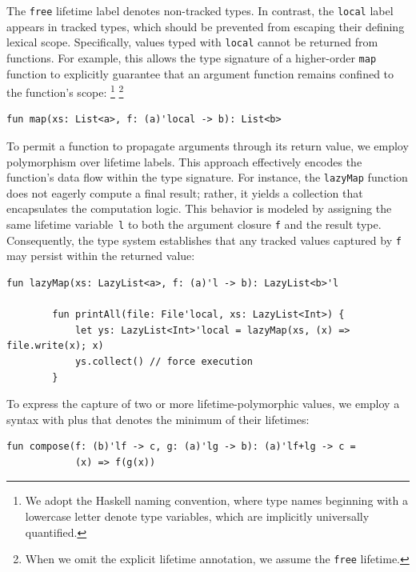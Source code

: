 \documentclass[11pt]{article}
\begin{document}
    The \lstinline[language=colang]|free| lifetime label denotes non-tracked types.
    In contrast, the \lstinline[language=colang]|local| label appears in tracked types, which should be prevented from escaping their defining lexical scope.
    Specifically, values typed with \lstinline[language=colang]|local| cannot be returned from functions.
    For example, this allows the type signature of a higher-order \lstinline[language=colang]|map| function to explicitly guarantee that an argument function remains confined to the function's scope:%
    \footnote{We adopt the Haskell naming convention, where type names beginning with a lowercase letter denote type variables, which are implicitly universally quantified.}%
    \footnote{When we omit the explicit lifetime annotation, we assume the \lstinline[language=colang]|free| lifetime.}
    \begin{lstlisting}[language=colang]
        fun map(xs: List<a>, f: (a)'local -> b): List<b>
    \end{lstlisting}

    To permit a function to propagate arguments through its return value, we employ polymorphism over lifetime labels.
    This approach effectively encodes the function’s data flow within the type signature.
    For instance, the \lstinline[language=colang]|lazyMap| function does not eagerly compute a final result; rather, it yields a collection that encapsulates the computation logic.
    This behavior is modeled by assigning the same lifetime variable~\lstinline[language=colang]|l| to both the argument closure \lstinline[language=colang]|f| and the result type.
    Consequently, the type system establishes that any tracked values captured by \lstinline[language=colang]|f| may persist within the returned value:
    \begin{lstlisting}[language=colang]
        fun lazyMap(xs: LazyList<a>, f: (a)'l -> b): LazyList<b>'l

        fun printAll(file: File'local, xs: LazyList<Int>) {
            let ys: LazyList<Int>'local = lazyMap(xs, (x) => file.write(x); x)
            ys.collect() // force execution
        }
    \end{lstlisting}

    To express the capture of two or more lifetime-polymorphic values, we employ a syntax with plus that denotes the minimum of their lifetimes:
    \begin{lstlisting}[language=colang]
        fun compose(f: (b)'lf -> c, g: (a)'lg -> b): (a)'lf+lg -> c =
            (x) => f(g(x))
    \end{lstlisting}
\end{document}
